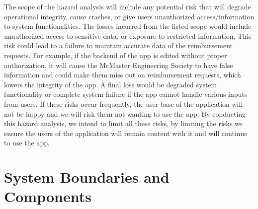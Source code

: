 \documentclass{article}
\begin{document}
The scope of the hazard analysis will include any potential risk that will degrade operational integrity, cause crashes, or give users unauthorized access/information to system functionalities. The losses incurred from the listed scope would include unauthorized access to sensitive data, or exposure to restricted information. This risk could lead to a failure to maintain accurate data of the reimbursement requests. For example, if the backend of the app is edited without proper authorization, it will cause the McMaster Engineering Society to have false information and could make them miss out on reimbursement requests, which lowers the integrity of the app. A final loss would be degraded system functionality or complete system failure if the app cannot handle various inputs from users. If these risks occur frequently, the user base of the application will not be happy and we will risk them not wanting to use the app. By conducting this hazard analysis, we intend to limit all these risks, by limiting the risks we ensure the users of the application will remain content with it and will continue to use the app. 


\section{System Boundaries and Components}
\end{document}
